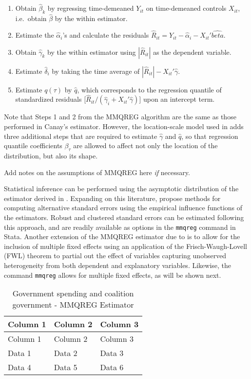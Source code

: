 \documentclass[bib]{statapress}
\begin{document}
\begin{enumerate}
\def\labelenumi{\arabic{enumi}.}
\item
  Obtain \(\hat{\beta}_k\) by regressing time-demeaned \(Y_{it}\) on
  time-demeaned controls \(X_{it}\), i.e.~obtain \(\hat{\beta}\) by the
  within estimator.
\item
  Estimate the \(\hat{\alpha}_i\)'s and calculate the residuals
  \(\hat{R}_{it} = Y_{it} - \hat{\alpha}_i - X_{it}' \hat{beta}\).
\item
  Obtain \(\hat{\gamma}_k\) by the within estimator using
  \(|\hat{R}_{it}|\) as the dependent variable.
\item
  Estimate \(\hat{\delta}_i\) by taking the time average of
  \(|\hat{R}_{it}| - X_{it}' \hat{\gamma}\).
\item
  Estimate \(q(\tau)\) by \(\hat{q}\), which corresponds to the
  regression quantile of standardized residuals
  {[}\(\hat{R}_{it}/(\hat{\gamma}_{i} + X_{it}' \hat{\gamma})]\) upon an
  intercept term.
\end{enumerate}

Note that Steps 1 and 2 from the MMQREG algorithm are the same as those
performed in Canay's estimator. However, the location-scale model used
in \citep{mss2019} adds three additional steps that are required to
estimate \(\hat{\gamma}\) and \(\hat{q}\), so that regression quantile
coefficients \(\beta_{\tau}\) are allowed to affect not only the
location of the distribution, but also its shape.

Add notes on the assumptions of MMQREG here \emph{if} necessary.

Statistical inference can be performed using the asymptotic distribution
of the estimator derived in \citep{mss2019}. Expanding on this
literature, \citep{riosavila2024} propose methods for computing
alternative standard errors using the empirical influence functions of
the estimators. Robust and clustered standard errors can be estimated
following this approach, and are readily available as options in the
\texttt{mmqreg} command in Stata. Another extension of the MMQREG
estimator due to \citep{riosavila2024} is to allow for the inclusion of
multiple fixed effects using an application of the Frisch-Waugh-Lovell
(FWL) theorem to partial out the effect of variables capturing
unobserved heterogeneity from both dependent and explanatory variables.
Likewise, the command \texttt{mmqreg} allows for multiple fixed effects,
as will be shown next.

\begin{longtable}[]{@{}lll@{}}
\caption{Government spending and coalition government - MMQREG
Estimator}\tabularnewline
\toprule\noalign{}
Column 1 & Column 2 & Column 3 \\
\midrule\noalign{}
\endfirsthead
\toprule\noalign{}
Column 1 & Column 2 & Column 3 \\
\midrule\noalign{}
\endhead
\bottomrule\noalign{}
\endlastfoot
Data 1 & Data 2 & Data 3 \\
Data 4 & Data 5 & Data 6 \\
\end{longtable}
\end{document}

